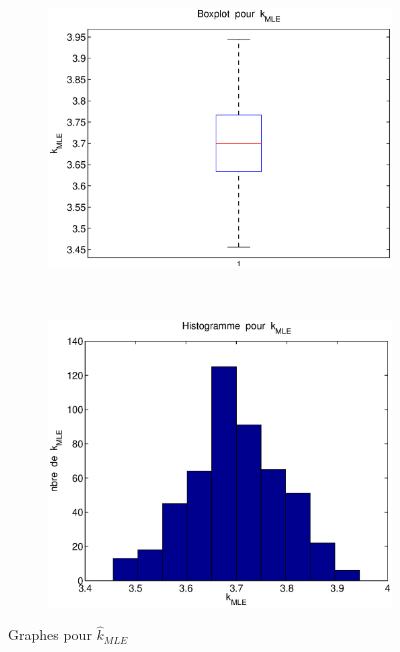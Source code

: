 \begin{figure}[!ht]
        \centering
        \begin{subfigure}[b]{0.4\textwidth}
                \includegraphics[width=\textwidth]{graphes/boxplot_kmle.eps}
        \end{subfigure}%
        ~
        \begin{subfigure}[b]{0.4\textwidth}
                \includegraphics[width=\textwidth]{graphes/hist_kmle.eps}
        \end{subfigure}
        \caption{Graphes pour $\hat{k}_{MLE}$}\label{fig:kmle}
\end{figure}

